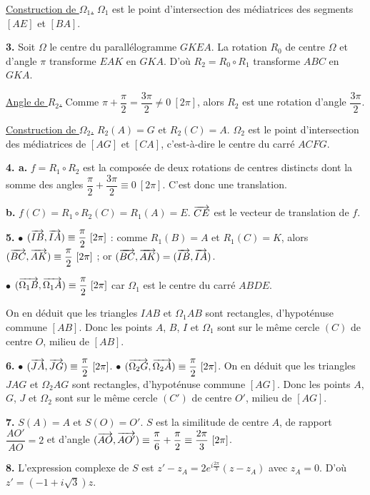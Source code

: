 \documentclass[11pt]{article}
\begin{document}
\underline{Construction de $\Omega_1$.} $\Omega_1$ est le point d'intersection des médiatrices des segments $[AE]$ et $[BA]$.

\textbf{3.} Soit $\Omega$ le centre du parallélogramme $GKEA$. La rotation $R_0$ de centre $\Omega$ et d'angle $\pi$ transforme $EAK$ en $GKA$. D'où $R_2 = R_0 \circ R_1$ transforme $ABC$ en $GKA$.

\underline{Angle de $R_2$.} Comme $\pi + \dfrac{\pi}{2} = \dfrac{3\pi}{2} \ne 0\ [2\pi]$, alors $R_2$ est une rotation d'angle $\dfrac{3\pi}{2}$.

\underline{Construction de $\Omega_2$.} $R_2(A) = G$ et $R_2(C) = A$. $\Omega_2$ est le point d'intersection des médiatrices de $[AG]$ et $[CA]$, c'est-à-dire le centre du carré $ACFG$.

\textbf{4. a.} $f = R_1 \circ R_2$ est la composée de deux rotations de centres distincts dont la somme des angles $\dfrac{\pi}{2} + \dfrac{3\pi}{2} \equiv 0\ [2\pi]$. C'est donc une translation.

\textbf{b.} $f(C) = R_1 \circ R_2(C) = R_1(A) = E$. $\overrightarrow{CE}$ est le vecteur de translation de $f$.

\textbf{5.} $\bullet$ $(\vv{IB}, \vv{IA}) \equiv \dfrac{\pi}{2}\ [2\pi]$ : comme $R_1(B) = A$ et $R_1(C) = K$, alors $(\overrightarrow{BC}, \overrightarrow{AK}) \equiv \dfrac{\pi}{2}\ [2\pi]$ ; or $(\overrightarrow{BC}, \overrightarrow{AK}) = (\overrightarrow{IB}, \overrightarrow{IA})$.

$\bullet$ $(\overrightarrow{\Omega_1 B}, \overrightarrow{\Omega_1 A}) \equiv \dfrac{\pi}{2}\ [2\pi]$ car $\Omega_1$ est le centre du carré $ABDE$.

On en déduit que les triangles $IAB$ et $\Omega_1 AB$ sont rectangles, d'hypoténuse commune $[AB]$. Donc les points $A$, $B$, $I$ et $\Omega_1$ sont sur le même cercle $(C)$ de centre $O$, milieu de $[AB]$.

\textbf{6.} $\bullet$ $(\vv{JA}, \vv{JG}) \equiv \dfrac{\pi}{2}\ [2\pi]$. \quad $\bullet$ $(\overrightarrow{\Omega_2 G}, \overrightarrow{\Omega_2 A}) \equiv \dfrac{\pi}{2}\ [2\pi]$. On en déduit que les triangles $JAG$ et $\Omega_2 AG$ sont rectangles, d'hypoténuse commune $[AG]$. Donc les points $A$, $G$, $J$ et $\Omega_2$ sont sur le même cercle $(C')$ de centre $O'$, milieu de $[AG]$.

\textbf{7.} $S(A) = A$ et $S(O) = O'$. $S$ est la similitude de centre $A$, de rapport $\dfrac{AO'}{AO} = 2$ et d'angle $(\vv{AO}, \vv{AO'}) \equiv \dfrac{\pi}{6} + \dfrac{\pi}{2} \equiv \dfrac{2\pi}{3}\ [2\pi]$.

\textbf{8.} L'expression complexe de $S$ est $z' - z_A = 2e^{i\frac{2\pi}{3}}(z - z_A)$ avec $z_A = 0$. D'où $z' = (-1 + i\sqrt{3})z$.
\end{document}
